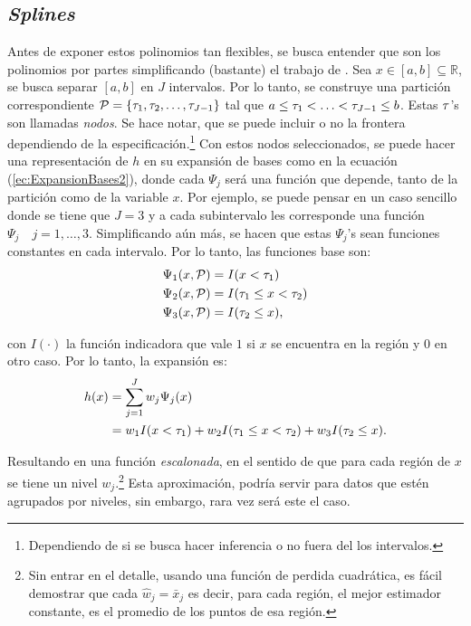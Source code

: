 \documentclass[../Main/Main.tex]{subfiles}
\begin{document}
\subsection{\textit{Splines}} \label{sec:PolisYSplines}
Antes de exponer estos polinomios tan flexibles, se busca entender que son los polinomios por partes simplificando (bastante) el trabajo de \citet{wahba1990splines}. Sea $x\in[a,b]\subseteq\mathbb{R}$, se busca separar $[a,b]$ en $J$ intervalos. Por lo tanto, se construye una partición correspondiente $\mathcal{P} = \left\{\tau_1,  \tau_2,\ldots,  \tau_{J-1} \right\}$ tal que $a \leq  \tau_1 < \ldots <  \tau_{J-1} \leq b$. Estas $ \tau$'s son llamadas \textit{nodos}. Se hace notar, que se puede incluir o no la frontera dependiendo de la especificación.\footnote{Dependiendo de si se busca hacer inferencia o no fuera del  los intervalos.} Con estos nodos seleccionados, se puede hacer una representación de $h$ en su expansión de bases como en la ecuación (\ref{ec:ExpansionBases2}), donde cada $\Psi_j$ será una función que depende, tanto de la partición como de la variable $x$. Por ejemplo, se puede pensar en un caso sencillo donde se tiene que $J = 3$ y a cada subintervalo les corresponde una función $\Psi_j  \quad j = 1,\ldots,3$. Simplificando aún más, se hacen que estas $\Psi_j$'s sean funciones constantes en cada intervalo. Por lo tanto, las funciones base son:
\begin{align*}
	\Psi_1(x,\mathcal{P}) &= I( x <  \tau_1) \\
	\Psi_2(x,\mathcal{P}) &= I( \tau_1 \leq x <  \tau_2) \\
	\Psi_3(x,\mathcal{P}) &= I( \tau_2 \leq x ),
\end{align*}

con $I(\cdot)$ la función indicadora que vale $1$ si $x$ se encuentra en la región y $0$ en otro caso. Por lo tanto, la expansión es: 
\begin{align*}
		h(x) &= \sum_{j = 1}^J w_j\Psi_j(x) \\
			 &= w_1 I( x <  \tau_1) + w_2 I( \tau_1 \leq x <  \tau_2) + w_3 I( \tau_2 \leq x).
\end{align*}

Resultando en una función \textit{escalonada}, en el sentido de que para cada región de $x$ se tiene un nivel $w_j$.\footnote{Sin entrar en el detalle, usando una función de perdida cuadrática, es fácil demostrar que cada $\hat{w}_j = \bar{x}_j$ es decir, para cada región, el mejor estimador constante, es el promedio de los puntos de esa región.} Esta aproximación, podría servir para datos que estén agrupados por niveles, sin embargo, rara vez será este el caso.
\end{document}
